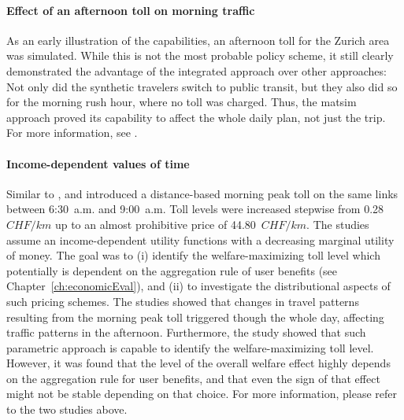 \paragraph{Effect of an afternoon toll on morning traffic}

As an early illustration of the capabilities, an afternoon toll for the Zurich area was simulated.  While this is not the most probable policy scheme, it still clearly demonstrated the advantage of the integrated approach over other approaches: Not only did the synthetic travelers switch to public transit, but they also did so for the morning rush hour, where no toll was charged.  Thus, the \acrshort{matsim} approach proved its capability to affect the whole daily plan, not just the trip.  For more information, see \cite{RieserEtAl_TRBTDF_2008}.




\paragraph{Income-dependent values of time}

Similar to \cite{RieserEtAl_TRBTDF_2008}, \cite{KickhoeferEtAl2010EconomicEvaluationPublicAcceptanceRoadPricingKuhmo} and \cite{Kickhoefer_PhDThesis_2014} introduced a distance-based morning peak toll on the same links between 6:30~a.m. and 9:00~a.m. Toll levels were increased stepwise from 0.28~$CHF/km$ up to an almost prohibitive price of 44.80~$CHF/km$. The studies assume an income-dependent utility functions with a decreasing marginal utility of money. The goal was to (i) identify the welfare-maximizing toll level which potentially is dependent on the aggregation rule of user benefits (see Chapter~\ref{ch:economicEval}), and (ii) to investigate the distributional aspects of such pricing schemes.
%
The studies showed that changes in travel patterns resulting from the morning peak toll triggered though the whole day, affecting traffic patterns in the afternoon.
%
Furthermore, the study showed that such parametric approach is capable to identify the welfare-maximizing toll level. However, it was found that the level of the overall welfare effect highly depends on the aggregation rule for user benefits, and that even the sign of that effect might not be stable depending on that choice.
%
For more information, please refer to the two studies above.

